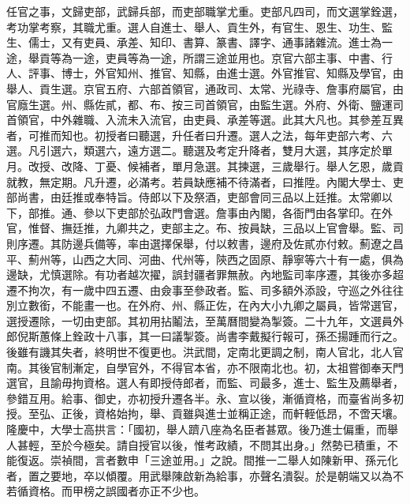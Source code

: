 任官之事，文歸吏部，武歸兵部，而吏部職掌尤重。吏部凡四司，而文選掌銓選，考功掌考察，其職尤重。選人自進士、舉人、貢生外，有官生、恩生、功生、監生、儒士，又有吏員、承差、知印、書算、篆書、譯字、通事諸雜流。進士為一途，舉貢等為一途，吏員等為一途，所謂三途並用也。京官六部主事、中書、行人、評事、博士，外官知州、推官、知縣，由進士選。外官推官、知縣及學官，由舉人、貢生選。京官五府、六部首領官，通政司、太常、光祿寺、詹事府屬官，由官廕生選。州、縣佐貳，都、布、按三司首領官，由監生選。外府、外衛、鹽運司首領官，中外雜職、入流未入流官，由吏員、承差等選。此其大凡也。其參差互異者，可推而知也。初授者曰聽選，升任者曰升遷。選人之法，每年吏部六考、六選。凡引選六，類選六，遠方選二。聽選及考定升降者，雙月大選，其序定於單月。改授、改降、丁憂、候補者，單月急選。其揀選，三歲舉行。舉人乞恩，歲貢就教，無定期。凡升遷，必滿考。若員缺應補不待滿者，曰推陞。內閣大學士、吏部尚書，由廷推或奉特旨。侍郎以下及祭酒，吏部會同三品以上廷推。太常卿以下，部推。通、參以下吏部於弘政門會選。詹事由內閣，各衙門由各掌印。在外官，惟督、撫廷推，九卿共之，吏部主之。布、按員缺，三品以上官會舉。監、司則序遷。其防邊兵備等，率由選擇保舉，付以敕書，邊府及佐貳亦付敕。薊遼之昌平、薊州等，山西之大同、河曲、代州等，陝西之固原、靜寧等六十有一處，俱為邊缺，尤慎選除。有功者越次擢，誤封疆者罪無赦。內地監司率序遷，其後亦多超遷不拘次，有一歲中四五遷、由僉事至參政者。監、司多額外添設，守巡之外往往別立數銜，不能畫一也。在外府、州、縣正佐，在內大小九卿之屬員，皆常選官，選授遷除，一切由吏部。其初用拈鬮法，至萬曆間變為掣簽。二十九年，文選員外郎倪斯蕙條上銓政十八事，其一曰議掣簽。尚書李戴擬行報可，孫丕揚踵而行之。後雖有譏其失者，終明世不復更也。洪武間，定南北更調之制，南人官北，北人官南。其後官制漸定，自學官外，不得官本省，亦不限南北也。初，太祖嘗御奉天門選官，且諭毋拘資格。選人有即授侍郎者，而監、司最多，進士、監生及薦舉者，參錯互用。給事、御史，亦初授升遷各半。永、宣以後，漸循資格，而臺省尚多初授。至弘、正後，資格始拘，舉、貢雖與進士並稱正途，而軒輊低昂，不啻天壤。隆慶中，大學士高拱言：「國初，舉人躋八座為名臣者甚眾。後乃進士偏重，而舉人甚輕，至於今極矣。請自授官以後，惟考政績，不問其出身。」然勢已積重，不能復返。崇禎間，言者數申「三途並用。」之說。間推一二舉人如陳新甲、孫元化者，置之要地，卒以傾覆。用武舉陳啟新為給事，亦聲名潰裂。於是朝端又以為不若循資格。而甲榜之誤國者亦正不少也。


